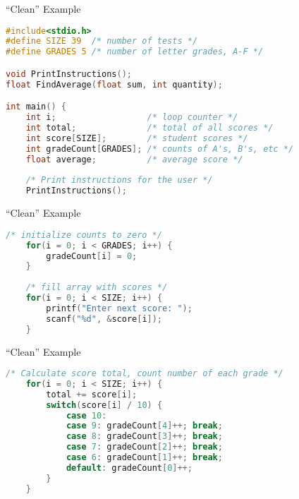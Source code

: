 \documentclass[graphics]{beamer}
\begin{document}
\begin{frame}[fragile]{``Clean'' Example}
    \begin{lstlisting}[language=C,basicstyle=\footnotesize,keywordstyle=\color{blue},commentstyle=\color{green},showstringspaces=false,stringstyle=\color{red}]
#include<stdio.h>
#define SIZE 39  /* number of tests */
#define GRADES 5 /* number of letter grades, A-F */

void PrintInstructions();
float FindAverage(float sum, int quantity);

int main() {
    int i;                  /* loop counter */
    int total;              /* total of all scores */
    int score[SIZE];        /* student scores */
    int gradeCount[GRADES]; /* counts of A's, B's, etc */
    float average;          /* average score */
    
    /* Print instructions for the user */
    PrintInstructions();
    \end{lstlisting}
\end{frame}

\begin{frame}[fragile]{``Clean'' Example}
    \begin{lstlisting}[language=C,basicstyle=\footnotesize,keywordstyle=\color{blue},commentstyle=\color{green},showstringspaces=false,stringstyle=\color{red}]
    /* initialize counts to zero */
    for(i = 0; i < GRADES; i++) {
        gradeCount[i] = 0;
    }
    
    /* fill array with scores */
    for(i = 0; i < SIZE; i++) {
        printf("Enter next score: ");
        scanf("%d", &score[i]);
    }
    \end{lstlisting}
\end{frame}

\begin{frame}[fragile]{``Clean'' Example}
    \begin{lstlisting}[language=C,basicstyle=\footnotesize,keywordstyle=\color{blue},commentstyle=\color{green},showstringspaces=false,stringstyle=\color{red}]
    /* Calculate score total, count number of each grade */
    for(i = 0; i < SIZE; i++) {
        total += score[i];
        switch(score[i] / 10) {
            case 10:
            case 9: gradeCount[4]++; break;
            case 8: gradeCount[3]++; break;
            case 7: gradeCount[2]++; break;
            case 6: gradeCount[1]++; break;
            default: gradeCount[0]++;
        }
    }
    \end{lstlisting}
\end{frame}
\end{document}
